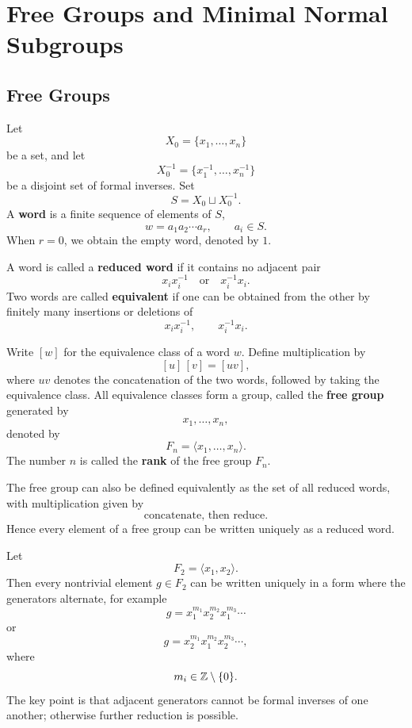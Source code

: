 \chapter{Free Groups and Minimal Normal Subgroups}

\section{Free Groups}

\begin{definition}
Let
\[
X_0=\{x_1,\dots,x_n\}
\]
be a set, and let
\[
X_0^{-1}=\{x_1^{-1},\dots,x_n^{-1}\}
\]
be a disjoint set of formal inverses. Set
\[
S=X_0\sqcup X_0^{-1}.
\]
A \textbf{word} is a finite sequence of elements of \(S\),
\[
w=a_1a_2\cdots a_r,\qquad a_i\in S.
\]
When \(r=0\), we obtain the empty word, denoted by \(1\).

A word is called a \textbf{reduced word} if it contains no adjacent pair
\[
x_i x_i^{-1}\quad \text{or}\quad x_i^{-1}x_i.
\]
Two words are called \textbf{equivalent} if one can be obtained from the other by finitely many insertions or deletions of
\[
x_i x_i^{-1},\qquad x_i^{-1}x_i.
\]

Write \([w]\) for the equivalence class of a word \(w\). Define multiplication by
\[
[u]\,[v]=[uv],
\]
where \(uv\) denotes the concatenation of the two words, followed by taking the equivalence class. All equivalence classes form a group, called the \textbf{free group} generated by
\[
x_1,\dots,x_n,
\]
denoted by
\[
F_n=\langle x_1,\dots,x_n\rangle.
\]
The number \(n\) is called the \textbf{rank} of the free group \(F_n\).
\end{definition}

\begin{remark}
The free group can also be defined equivalently as the set of all reduced words, with multiplication given by
\[
\text{concatenate, then reduce}.
\]
Hence every element of a free group can be written uniquely as a reduced word.
\end{remark}

\begin{example}
Let
\[
F_2=\langle x_1,x_2\rangle.
\]
Then every nontrivial element \(g\in F_2\) can be written uniquely in a form where the generators alternate, for example
\[
g=x_1^{m_1}x_2^{m_2}x_1^{m_3}\cdots
\]
or
\[
g=x_2^{m_1}x_1^{m_2}x_2^{m_3}\cdots,
\]
where
\[
m_i\in \mathbb{Z}\setminus\{0\}.
\]
The key point is that adjacent generators cannot be formal inverses of one another; otherwise further reduction is possible.
\end{example}

